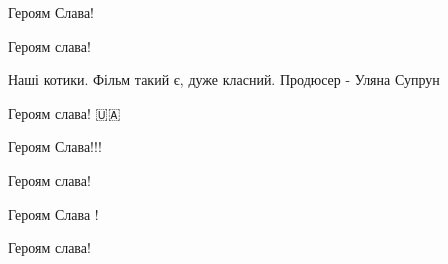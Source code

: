 Героям Слава!

 
Героям слава!

 
Наші котики. Фільм такий є, дуже класний. Продюсер - Уляна Супрун

 
Героям слава! 🇺🇦

 
Героям Слава!!!

 
Героям слава!

 
Героям Слава !

 
Героям слава!

